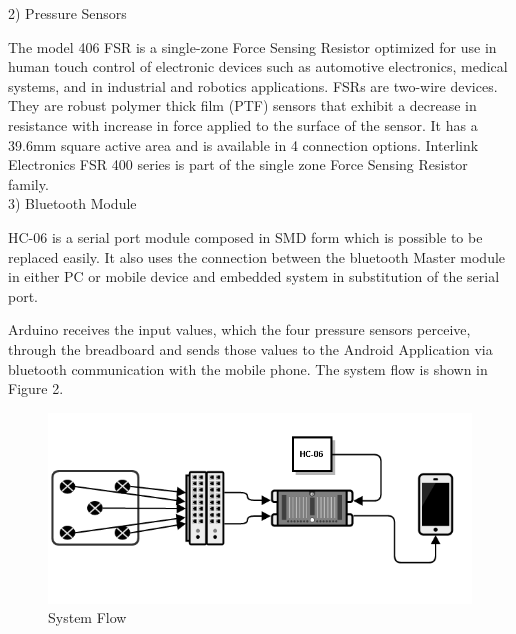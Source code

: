 \documentclass[conference]{IEEEtran}
\begin{document}
2)	Pressure Sensors

The model 406 FSR is a single-zone Force Sensing Resistor optimized for use in human touch control of electronic devices such as automotive electronics, medical systems, and in industrial and robotics applications. FSRs are two-wire devices. They are robust polymer thick film (PTF) sensors that exhibit a decrease in resistance with increase in force applied to the surface of the sensor. It has a 39.6mm square active area and is available in 4 connection options. Interlink Electronics FSR 400 series is part of the single zone Force Sensing Resistor family.\\

3)	Bluetooth Module

HC-06 is a serial port module composed in SMD form which is possible to be replaced easily. It also uses the connection between the bluetooth Master module in either PC or mobile device and embedded system in substitution of the serial port. 

Arduino receives the input values, which the four pressure sensors perceive, through the breadboard and sends those values to the Android Application via bluetooth communication with the mobile phone. The system flow is shown in Figure 2.\\

\begin{figure}[H]
\begin{center}
    \includegraphics[scale=0.4]{img_01.png}
    \caption{System Flow} 
\end{center}
\end{figure}
\end{document}
